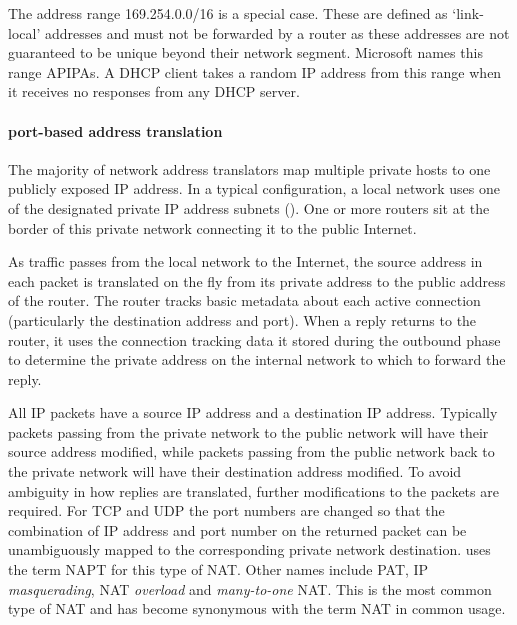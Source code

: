 The address range 169.254.0.0/16 is a special case.
These are defined as `link-local' addresses and must not be forwarded by a router as these addresses are not guaranteed to be unique beyond their network segment.%
Microsoft names this range \acp{APIPA}.%
A \acs{DHCP} client takes a random \acs{IP} address from this range when it receives no responses from any \acs{DHCP} server.

\paragraph{port-based address translation}
The majority of network address translators map multiple private hosts to one publicly exposed \acs{IP} address.
In a typical configuration, a local network uses one of the designated private \acs{IP} address subnets ().
One or more routers sit at the border of this private network connecting it to the public Internet.

As traffic passes from the local network to the Internet, the source address in each packet is translated on the fly from its private address to the public address of the router.
The router tracks basic metadata about each active connection (particularly the destination address and port).
When a reply returns to the router, it uses the connection tracking data it stored during the outbound phase to determine the private address on the internal network to which to forward the reply.

All \acs{IP} packets have a source \acs{IP} address and a destination \acs{IP} address.
Typically packets passing from the private network to the public network will have their source address modified, while packets passing from the public network back to the private network will have their destination address modified.
To avoid ambiguity in how replies are translated, further modifications to the packets are required.
For \acs{TCP} and \acs{UDP} the port numbers are changed so that the combination of \acs{IP} address and port number on the returned packet can be unambiguously mapped to the corresponding private network destination.
 uses the term \gls{NAPT} for this type of \acs{NAT}.
Other names include \gls{PAT}, \acs{IP} \emph{masquerading}, \acs{NAT} \emph{overload} and \emph{many-to-one} \acs{NAT}.
This is the most common type of \acs{NAT} and has become synonymous with the term \acs{NAT} in common usage.

